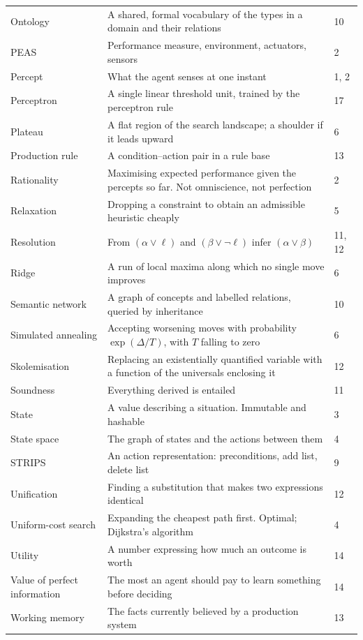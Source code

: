 \begin{longtable}{@{}L{3.6cm}L{10.2cm}L{1.0cm}@{}}
Ontology & A shared, formal vocabulary of the types in a domain and their
relations & 10 \\
PEAS & Performance measure, environment, actuators, sensors & 2 \\
Percept & What the agent senses at one instant & 1, 2 \\
Perceptron & A single linear threshold unit, trained by the perceptron rule & 17 \\
Plateau & A flat region of the search landscape; a shoulder if it leads upward &
6 \\
Production rule & A condition--action pair in a rule base & 13 \\
Rationality & Maximising expected performance given the percepts so far. Not
omniscience, not perfection & 2 \\
Relaxation & Dropping a constraint to obtain an admissible heuristic cheaply &
5 \\
Resolution & From $(\alpha \vee \ell)$ and $(\beta \vee \neg\ell)$ infer
$(\alpha \vee \beta)$ & 11, 12 \\
Ridge & A run of local maxima along which no single move improves & 6 \\
Semantic network & A graph of concepts and labelled relations, queried by
inheritance & 10 \\
Simulated annealing & Accepting worsening moves with probability
$\exp(\Delta/T)$, with $T$ falling to zero & 6 \\
Skolemisation & Replacing an existentially quantified variable with a function of
the universals enclosing it & 12 \\
Soundness & Everything derived is entailed & 11 \\
State & A value describing a situation. Immutable and hashable & 3 \\
State space & The graph of states and the actions between them & 4 \\
STRIPS & An action representation: preconditions, add list, delete list & 9 \\
Unification & Finding a substitution that makes two expressions identical & 12 \\
Uniform-cost search & Expanding the cheapest path first. Optimal; Dijkstra's
algorithm & 4 \\
Utility & A number expressing how much an outcome is worth & 14 \\
Value of perfect information & The most an agent should pay to learn something
before deciding & 14 \\
Working memory & The facts currently believed by a production system & 13 \\
\bottomrule
\end{longtable}
